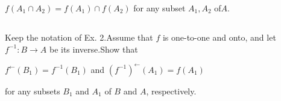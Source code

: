 \documentclass[11pt]{amsbook}
\begin{document}

 $  f(A_{1} \cap A_{2}) = f(A_{1}) \cap f(A_{2}) $ for any subset $A_{1}, A_{2}$ of$ A$.

    


\subsection{}

Keep the notation of Ex. 2.Assume that $f$ is one-to-one and onto, and let 
$ f^{-1} : B \to A $ be its inverse.Show that 
\begin{center}
$ f^{\gets}(B_{1}) = f^{-1}(B_{1})  $ and $   (f^{-1})^{\gets}(A_{1}) = f(A_{1})$
\end{center}

for any subsets $B_{1}$ and $ A_{1}$ of $B$ and $A$, respectively.
\end{document}
